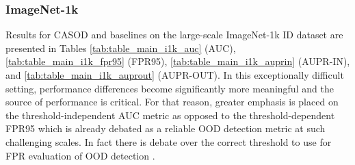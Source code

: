 \subsubsection{ImageNet-1k}
Results for CASOD and baselines on the large-scale ImageNet-1k ID dataset are presented in Tables \ref{tab:table_main_i1k_auc} (AUC), \ref{tab:table_main_i1k_fpr95} (FPR95), \ref{tab:table_main_i1k_auprin} (AUPR-IN), and \ref{tab:table_main_i1k_auprout} (AUPR-OUT). %
In this exceptionally difficult setting, performance differences become significantly more meaningful and the source of performance is critical. For that reason, greater emphasis is placed on the threshold-independent AUC metric as opposed to the threshold-dependent FPR95 which is already debated as a reliable OOD detection metric at such challenging scales. In fact there is debate over the correct threshold to use for FPR evaluation of OOD detection \cite{humblot2023beyond}. 

